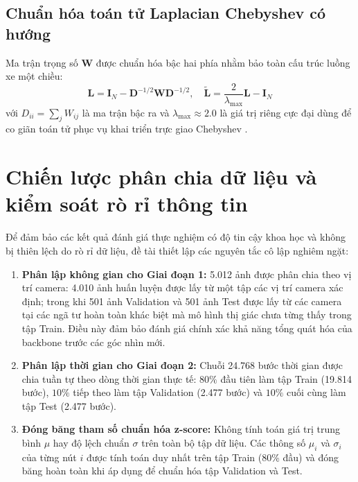 \subsection{Chuẩn hóa toán tử Laplacian Chebyshev có hướng}
Ma trận trọng số $\mathbf{W}$ được chuẩn hóa bậc hai phía nhằm bảo toàn cấu trúc luồng xe một chiều:
\begin{equation}
    \mathbf{L} = \mathbf{I}_N - \mathbf{D}^{-1/2} \mathbf{W} \mathbf{D}^{-1/2}, \quad \tilde{\mathbf{L}} = \frac{2}{\lambda_{\max}} \mathbf{L} - \mathbf{I}_N
\end{equation}
với $D_{ii} = \sum_j W_{ij}$ là ma trận bậc ra và $\lambda_{\max} \approx 2.0$ là giá trị riêng cực đại dùng để co giãn toán tử phục vụ khai triển trực giao Chebyshev \cite{chebnet}.

\section{Chiến lược phân chia dữ liệu và kiểm soát rò rỉ thông tin}
\label{sec:phan_chia_du_lieu}

Để đảm bảo các kết quả đánh giá thực nghiệm có độ tin cậy khoa học và không bị thiên lệch do rò rỉ dữ liệu, đề tài thiết lập các nguyên tắc cô lập nghiêm ngặt:
\begin{enumerate}
    \item \textbf{Phân lập không gian cho Giai đoạn 1:} 5.012 ảnh được phân chia theo vị trí camera: 4.010 ảnh huấn luyện được lấy từ một tập các vị trí camera xác định; trong khi 501 ảnh Validation và 501 ảnh Test được lấy từ các camera tại các ngã tư hoàn toàn khác biệt mà mô hình thị giác chưa từng thấy trong tập Train. Điều này đảm bảo đánh giá chính xác khả năng tổng quát hóa của backbone trước các góc nhìn mới.
    \item \textbf{Phân lập thời gian cho Giai đoạn 2:} Chuỗi 24.768 bước thời gian được chia tuần tự theo dòng thời gian thực tế: $80\%$ đầu tiên làm tập Train (19.814 bước), $10\%$ tiếp theo làm tập Validation (2.477 bước) và $10\%$ cuối cùng làm tập Test (2.477 bước).
    \item \textbf{Đóng băng tham số chuẩn hóa z-score:} Không tính toán giá trị trung bình $\mu$ hay độ lệch chuẩn $\sigma$ trên toàn bộ tập dữ liệu. Các thông số $\mu_i$ và $\sigma_i$ của từng nút $i$ được tính toán duy nhất trên tập Train (80\% đầu) và đóng băng hoàn toàn khi áp dụng để chuẩn hóa tập Validation và Test.
\end{enumerate}

